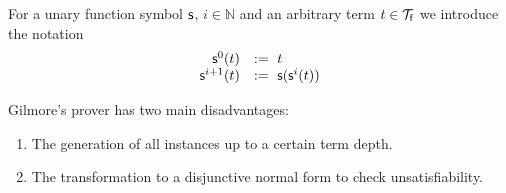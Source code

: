 \begin{example}\label{ex:succ}
\end{example}

\begin{definition}
	For a unary function symbol ${\mathsf s}$,
	$i\in\mathbb{N}$ and an arbitrary term $t\in{\mathcal T}_{\mathsf f}$ we introduce the notation
	\[
\begin{array}{rl}
{\mathsf s}^0(t) &:=\ t \\
{\mathsf s}^{i+1}(t) &:=\ {\mathsf s}({\mathsf s}^i(t))
\end{array}
	\]
\end{definition}



Gilmore's prover has two main disadvantages:
\begin{enumerate}
	\item The generation of all instances up to a certain term depth.
	\item The transformation to a disjunctive normal form to check unsatisfiability.
\end{enumerate}

